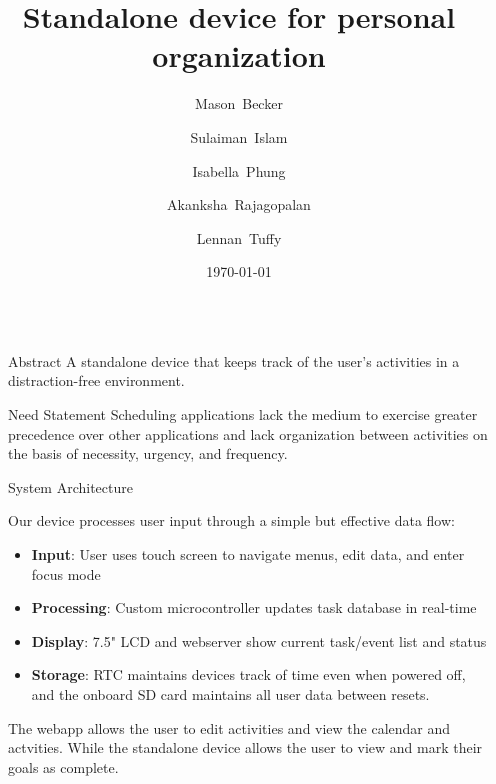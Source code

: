 \documentclass[final]{beamer}
\title{Standalone device for personal organization}
\author{
  Mason~Becker
  \and
  Sulaiman~Islam
  \and
  Isabella~Phung
  \and
  Akanksha~Rajagopalan
  \and
  Lennan~Tuffy
}
\institute[UC Santa Cruz]{CSE 123 - Supervised by Prof. David Harrison}
\date{\today}
\newlength{\sepwidth}
\newlength{\colwidth}
\newcommand{\separatorcolumn}{\begin{column}{\sepwidth}\end{column}}
\begin{document}
\begin{frame}[t]
\begin{columns}[t]
\separatorcolumn

\begin{column}{\colwidth}

  \begin{block}{Abstract}
    A standalone device that keeps track of the user's activities in a 
    distraction-free environment.
  \end{block}

  \begin{block}{Need Statement}
    Scheduling applications lack the medium to exercise greater precedence over other applications and lack organization between activities on the basis of necessity, urgency, and frequency.
  \end{block}

  \begin{block}{System Architecture} %

    Our device processes user input through a simple but effective data flow:

    \begin{itemize}
      \item \textbf{Input}: User uses touch screen to navigate menus, edit data, and enter focus mode
      \item \textbf{Processing}: Custom microcontroller updates task database in real-time  
      \item \textbf{Display}: 7.5" LCD and webserver show current task/event list and status
      \item \textbf{Storage}: RTC maintains devices track of time even when powered off, and the onboard SD card maintains all user data between resets.
    \end{itemize}

    The webapp allows the user to edit activities and view the calendar and actvities. While the standalone device allows the user to view and mark their goals as complete.

  \end{block}
    

\end{column}
\end{columns}
\end{frame}
\end{document}
